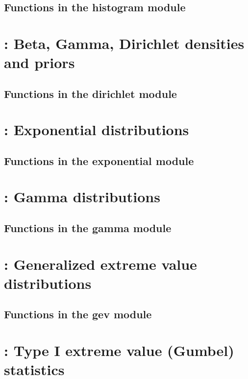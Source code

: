 \documentclass[10pt]{book}
\begin{document}
\subsection{Functions in the histogram module}


\newpage
\section{: Beta, Gamma, Dirichlet densities and priors}

\subsection{Functions in the dirichlet module}


\newpage
\section{: Exponential distributions}

\subsection{Functions in the exponential module}


\newpage
\section{: Gamma distributions}

\subsection{Functions in the gamma module}


\newpage
\section{: Generalized extreme value distributions}

\subsection{Functions in the gev module}


\newpage
\section{: Type I extreme value (Gumbel) statistics}

\end{document}
